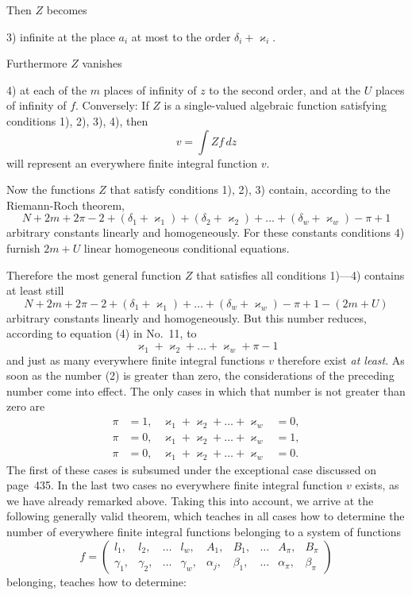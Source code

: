 \documentclass{article}
\begin{document}
Then $Z$ becomes

3) infinite at the place $a_i$ at most to the order $\delta_i + \varkappa_i$.

Furthermore $Z$ vanishes

4) at each of the $m$ places of infinity of $z$ to the second order, and at the $U$ places of infinity of $f$.
Conversely: If $Z$ is a single-valued algebraic function satisfying conditions 1), 2), 3), 4), then
\[
v = \int Z f\,dz
\]
will represent an everywhere finite integral function $v$.

Now the functions $Z$ that satisfy conditions 1), 2), 3) contain, according to the Riemann-Roch theorem,
\[
N + 2m + 2\pi - 2 + (\delta_1 + \varkappa_1) + (\delta_2 + \varkappa_2) + \dots + (\delta_w + \varkappa_w) - \pi + 1
\]
arbitrary constants linearly and homogeneously. For these constants conditions 4) furnish $2m + U$ linear homogeneous conditional equations.

Therefore the most general function $Z$ that satisfies all conditions 1)---4) contains at least still
\[
N + 2m + 2\pi - 2 + (\delta_1 + \varkappa_1) + \dots + (\delta_w + \varkappa_w) - \pi + 1 - (2m + U)
\]
arbitrary constants linearly and homogeneously. But this number reduces, according to equation (4) in No.~11, to
\[
\varkappa_1 + \varkappa_2 + \dots + \varkappa_w + \pi - 1 \tag{2}
\]
and just as many everywhere finite integral functions $v$ therefore exist \emph{at least}. As soon as the number (2) is greater than zero, the considerations of the preceding number come into effect. The only cases in which that number is not greater than zero are
\[
\begin{aligned}
\pi &= 1, & \varkappa_1 + \varkappa_2 + \dots + \varkappa_w &= 0, \\
\pi &= 0, & \varkappa_1 + \varkappa_2 + \dots + \varkappa_w &= 1, \\
\pi &= 0, & \varkappa_1 + \varkappa_2 + \dots + \varkappa_w &= 0.
\end{aligned}
\]
The first of these cases is subsumed under the exceptional case discussed on page~435. In the last two cases no everywhere finite integral function $v$ exists, as we have already remarked above. Taking this into account, we arrive at the following generally valid theorem, which teaches in all cases how to determine the number of everywhere finite integral functions belonging to a system of functions
\[
f = \begin{pmatrix}
l_1, & l_2, & \dots & l_w, & A_1, & B_1, & \dots & A_\pi, & B_\pi \\
\gamma_1, & \gamma_2, & \dots & \gamma_w, & \alpha_j, & \beta_1, & \dots & \alpha_\pi, & \beta_\pi
\end{pmatrix}
\]
belonging, teaches how to determine:
\end{document}
